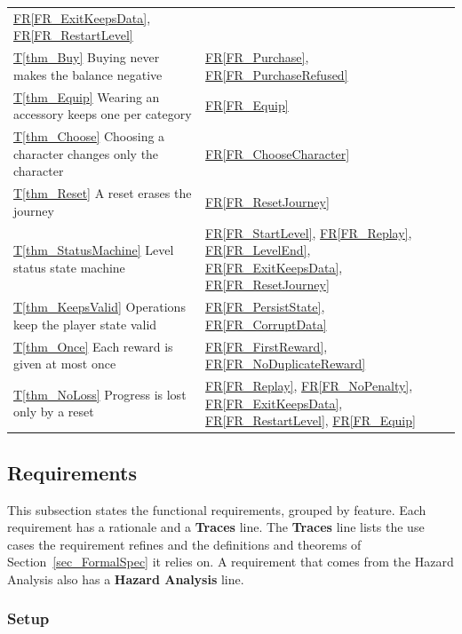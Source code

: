 \documentclass[12pt]{article}
\newcommand{\rref}[1]{\hyperref[#1]{FR\ref*{#1}}}
\newcommand{\thmref}[1]{\hyperref[#1]{T\ref*{#1}}}
\begin{document}
\begin{longtable}{>{\raggedright\arraybackslash}p{}>{\raggedright\arraybackslash}p{}}
  \rref{FR_ExitKeepsData}, \rref{FR_RestartLevel}\\
\thmref{thm_Buy} Buying never makes the balance negative &
  \rref{FR_Purchase}, \rref{FR_PurchaseRefused}\\
\thmref{thm_Equip} Wearing an accessory keeps one per category &
  \rref{FR_Equip}\\
\thmref{thm_Choose} Choosing a character changes only the character &
  \rref{FR_ChooseCharacter}\\
\thmref{thm_Reset} A reset erases the journey & \rref{FR_ResetJourney}\\
\thmref{thm_StatusMachine} Level status state machine & \rref{FR_StartLevel},
  \rref{FR_Replay}, \rref{FR_LevelEnd}, \rref{FR_ExitKeepsData},
  \rref{FR_ResetJourney}\\
\thmref{thm_KeepsValid} Operations keep the player state valid &
  \rref{FR_PersistState}, \rref{FR_CorruptData}\\
\thmref{thm_Once} Each reward is given at most once & \rref{FR_FirstReward},
  \rref{FR_NoDuplicateReward}\\
\thmref{thm_NoLoss} Progress is lost only by a reset & \rref{FR_Replay},
  \rref{FR_NoPenalty}, \rref{FR_ExitKeepsData},
  \rref{FR_RestartLevel}, \rref{FR_Equip}\\
\bottomrule
\end{longtable}

\subsection{Requirements}
\label{sec_FRList}

This subsection states the functional requirements, grouped by feature. Each
requirement has a rationale and a \textbf{Traces} line. The \textbf{Traces}
line lists the use cases the requirement refines and the definitions and
theorems of Section~\ref{sec_FormalSpec} it relies on. A requirement that
comes from the Hazard Analysis also has a \textbf{Hazard Analysis} line.

\subsubsection{Setup}
\label{sec_FRSetup}
\end{document}
